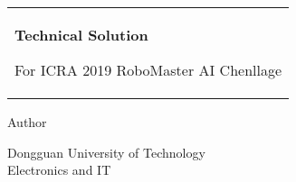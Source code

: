 \begin{titlepage}


\noindent
\begin{tabular}{@{}p{\textwidth}@{}}
	\vspace{0.2cm}
	\begin{center}
		\Huge{\textbf{Technical Solution}}
	\end{center}

	\begin{center}
		\Large{For ICRA 2019 RoboMaster AI Chenllage}
	\end{center}
	
	\vspace{0.2cm}\\
\end{tabular}

\vspace{4 cm}
\begin{center}{\large Author}\\
	\vspace{0.2cm}{\Large Yi-Kang Gu}

	\vspace{0.2cm}{\Large Zhao-Yi Meng}

\end{center}

\vfill
\begin{center}
  Dongguan University of Technology\\
  Electronics and IT
\end{center}


\end{titlepage}
\clearpage